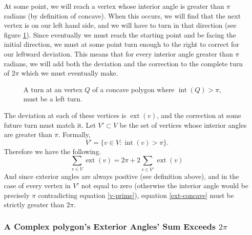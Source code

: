 \documentclass{article}
\newcommand{\inta}[1]{\operatorname{int}\left( #1 \right)} %
\newcommand{\exta}[1]{\operatorname{ext}\left( #1 \right)} %
\begin{document}
At some point, we will reach a vertex whose interior angle is greater than \(\pi\) radians (by definition of concave). When this occurs, we will find that the next vertex is on our left hand side, and we will have to turn in that direction (see figure \ref{walk-2}). Since eventually we must reach the starting point and be facing the initial direction, we must at some point turn enough to the right to correct for our leftward deviation. This means that for every interior angle greater than \(\pi\) radians, we will add both the deviation and the correction to the complete turn of \(2\pi\) which we must eventually make.

\begin{figure}
	\centering
	\caption{A turn at an vertex \(Q\) of a concave polygon where \(\inta{Q} > \pi\), must be a left turn.}
	\label{walk-2}
\end{figure}%

The deviation at each of these vertices is \(\exta{v}\), and the correction at some future turn must match it. Let \(V' \subset V\) be the set of vertices whose interior angles are greater than \(\pi\). Formally,
\begin{equation}
	V' = \{ v \in V : \inta{v} > \pi \}.
	\label{v-prime}
\end{equation}
Therefore we have the following.
\begin{equation}
	\sum_{v \in V} \exta{v} = 2\pi + 2\sum_{v \in V'} \exta{v}
	\label{ext-concave}
\end{equation}
And since exterior angles are always positive (see definition above), and in the case of every vertex in \(V'\) not equal to zero (otherwise the interior angle would be precisely \(\pi\) contradicting equation \ref{v-prime}), equation \ref{ext-concave} must be strictly greater than \(2\pi\).

\subsubsection{A Complex polygon's Exterior Angles' Sum Exceeds \(2\pi\)}
\end{document}
